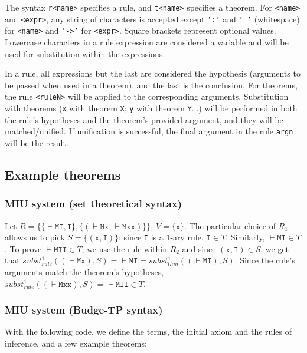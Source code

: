 \documentclass{article}
\begin{document}
The syntax \texttt{r<name>} specifies a rule, and \texttt{t<name>} specifies a theorem. For \texttt{<name>} and \texttt{<expr>}, any string of characters is accepted except \texttt{':'} and \texttt{' '} (whitespace) for \texttt{<name>} and \texttt{'->'} for \texttt{<expr>}. Square brackets represent optional values. Lowercase characters in a rule expression are considered a variable and will be used for substitution within the expressions.

In a rule, all expressions but the last are considered the hypothesis (arguments to be passed when used in a theorem), and the last is the conclusion. For theorems, the rule \texttt{<ruleN>} will be applied to the corresponding arguments. Substitution with theorems (\texttt{x} with theorem \texttt{X}; \texttt{y} with theorem \texttt{Y}...) will be performed in both the rule's hypotheses and the theorem's provided argument, and they will be matched/unified. If unification is successful, the final argument in the rule \texttt{argn} will be the result.

\subsection{Example theorems}

\subsubsection{MIU system\cite{b1} (set theoretical syntax)}

Let $R = \{ \{ \vdash\texttt{MI}, \texttt{I} \}, \{ (\vdash\texttt{Mx}, \vdash\texttt{Mxx}) \} \}$, $V = \{ \texttt{x} \}$. The particular choice of $R_1$ allows us to pick $S = \{ (\texttt{x}, \texttt{I}) \}$; since \texttt{I} is a 1-ary rule, $\texttt{I} \in T$. Similarly, $\vdash \texttt{MI} \in T$. To prove $\vdash\texttt{MII} \in T$, we use the rule within $R_2$ and since $(\texttt{x}, \texttt{I}) \in S$, we get that $subst_{rule}^1((\vdash\texttt{Mx}), S) = \vdash\texttt{MI} = subst_{thm}^1((\vdash\texttt{MI}), S)$. Since the rule's arguments match the theorem's hypotheses, $subst_{rule}^1((\vdash\texttt{Mxx}), S) = \vdash\texttt{MII} \in T$.

\subsubsection{MIU system (Budge-TP syntax)}

With the following code, we define the terms, the initial axiom and the rules of inference, and a few example theorems:
\end{document}
